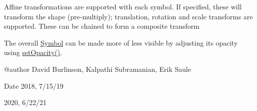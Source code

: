 Affine transformations are supported with each symbol. If specified, these will transform the shape (pre-\/multiply); translation, rotation and scale transforms are supported. These can be chained to form a composite transform

The overall \hyperlink{classbridges_1_1base_1_1_symbol}{Symbol} can be made more of less visible by adjusting its opacity using \hyperlink{classbridges_1_1base_1_1_symbol_abac237b439448cbef3744817d14061c5}{set\+Opacity()}. \begin{DoxyVerb}@author David Burlinson, Kalpathi Subramanian, Erik Saule
\end{DoxyVerb}


\begin{DoxyDate}{Date}
2018, 7/15/19 

2020, 6/22/21 
\end{DoxyDate}
